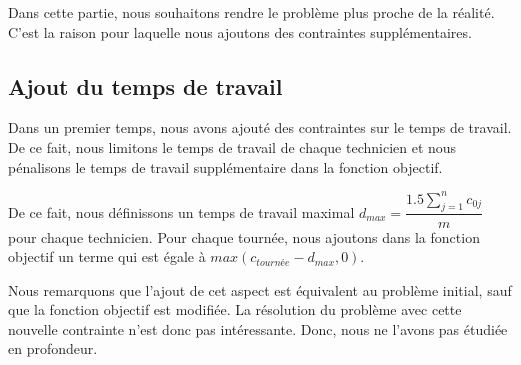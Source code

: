 Dans cette partie, nous souhaitons rendre le problème plus proche de la réalité. C'est la raison pour laquelle nous ajoutons des contraintes supplémentaires.

\subsection{Ajout du temps de travail}
\label{S ajout du temps de travail}
Dans un premier temps, nous avons ajouté des contraintes sur le temps de travail. De ce fait, nous limitons le temps de travail de chaque technicien et nous pénalisons le temps de travail supplémentaire dans la fonction objectif.

De ce fait, nous définissons un temps de travail maximal $d_{max} = \dfrac{1.5\sum_{j=1}^{n} c_{0j}}{m}$ pour chaque technicien. Pour chaque tournée, nous ajoutons dans la fonction objectif un terme qui est égale à $max(c_{tournée} - d_{max}, 0)$.

Nous remarquons que l'ajout de cet aspect est équivalent au problème initial, sauf que la fonction objectif est modifiée. La résolution du problème avec cette nouvelle contrainte n'est donc pas intéressante. Donc, nous ne l'avons pas étudiée en profondeur.